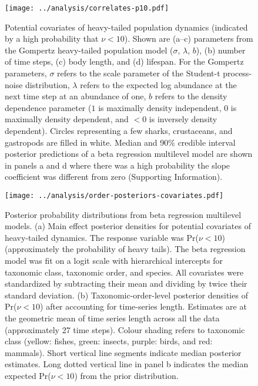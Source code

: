 \begin{figure}[htbp]
\begin{center}
\texttt{[image: ../analysis/correlates-p10.pdf]}
\caption{
Potential covariates of heavy-tailed population dynamics (indicated by a high probability that $\nu < 10$). Shown are (a--c) parameters from the Gompertz heavy-tailed population model ($\sigma$, $\lambda$, $b$), (b) number of time steps, (c) body length, and (d) lifespan. For the Gompertz parameters, $\sigma$ refers to the scale parameter of the Student-t process-noise distribution, $\lambda$ refers to the expected log abundance at the next time step at an abundance of one, $b$ refers to the density dependence parameter ($1$ is maximally density independent, $0$ is maximally density dependent, and $<0$ is inversely density dependent). Circles representing a few sharks, crustaceans, and gastropods are filled in white. Median and 90\% credible interval posterior predictions of a beta regression multilevel model are shown in panels a and d where there was a high probability the slope coefficient was different from zero (Supporting Information).
}
\label{fig:correlates}
\end{center}
\end{figure}

\begin{figure}[htbp]
\begin{center}
\texttt{[image: ../analysis/order-posteriors-covariates.pdf]}
\caption{
Posterior probability distributions from beta regression multilevel models.
(a) Main effect posterior densities for potential covariates of heavy-tailed dynamics. The response variable was Pr($\nu < 10$) (approximately the probability of heavy tails). The beta regression model was fit on a logit scale with hierarchical intercepts for taxonomic class, taxonomic order, and species. All covariates were standardized by subtracting their mean and dividing by twice their standard deviation.
(b) Taxonomic-order-level posterior densities of Pr($\nu < 10$) after accounting for time-series length. Estimates are at the geometric mean of time series length across all the data (approximately 27 time steps). Colour shading refers to taxonomic class (yellow: fishes, green: insects, purple: birds, and red: mammals). Short vertical line segments indicate median posterior estimates. Long dotted vertical line in panel b indicates the median expected Pr($\nu < 10$) from the prior distribution.
}
\label{fig:posteriors}
\end{center}
\end{figure}
